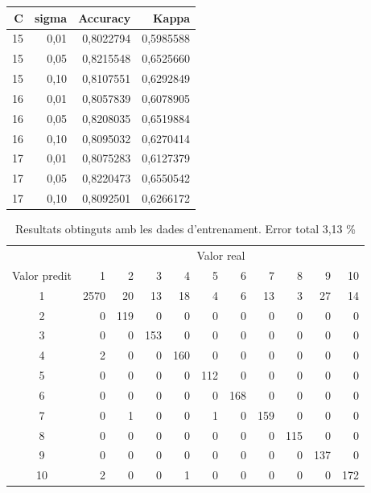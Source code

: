 \documentclass[a4paper]{article}
\begin{document}
\begin{table}[H]
	\centering
	\def\arraystretch{1.2}
	\begin{tabular}{|rrrr|}
		\hline
		C & sigma & Accuracy & Kappa \\
		\hline
		15 & 0,01 & 0,8022794 & 0,5985588 \\
		15 & 0,05 & 0,8215548 & 0,6525660 \\
		15 & 0,10 & 0,8107551 & 0,6292849 \\
		16 & 0,01 & 0,8057839 & 0,6078905 \\
		16 & 0,05 & 0,8208035 & 0,6519884 \\
		16 & 0,10 & 0,8095032 & 0,6270414 \\
		17 & 0,01 & 0,8075283 & 0,6127379 \\
		\rowcolor{Orange!40}
		17 & 0,05 & 0,8220473 & 0,6550542 \\
		17 & 0,10 & 0,8092501 & 0,6266172 \\
		\hline
	\end{tabular}
\end{table}

\begin{table}[H]
	\centering
	\def\arraystretch{1.2}
	\begin{tabular}{|c|rrrrrrrrrr|}
		\hline
		& \multicolumn{10}{c|}{Valor real} \\
		Valor predit & 1 & 2 & 3 & 4 & 5 & 6 & 7 & 8 & 9 & 10 \\
		\hline
		1 & 2570 & 20 & 13 & 18 & 4 & 6 & 13 & 3 & 27 & 14 \\
		2 & 0 & 119 & 0 & 0 & 0 & 0 & 0 & 0 & 0 & 0 \\
		3 & 0 & 0 & 153 & 0 & 0 & 0 & 0 & 0 & 0 & 0 \\
		4 & 2 & 0 & 0 & 160 & 0 & 0 & 0 & 0 & 0 & 0 \\
		5 & 0 & 0 & 0 & 0 & 112 & 0 & 0 & 0 & 0 & 0 \\
		6 & 0 & 0 & 0 & 0 & 0 & 168 & 0 & 0 & 0 & 0 \\
		7 & 0 & 1 & 0 & 0 & 1 & 0 & 159 & 0 & 0 & 0 \\
		8 & 0 & 0 & 0 & 0 & 0 & 0 & 0 & 115 & 0 & 0 \\
		9 & 0 & 0 & 0 & 0 & 0 & 0 & 0 & 0 & 137 & 0 \\
		10 & 2 & 0 & 0 & 1 & 0 & 0 & 0 & 0 & 0 & 172 \\
		\hline
	\end{tabular}
	\caption{Resultats obtinguts amb les dades d'entrenament. Error total 3,13 \%}
	\label{tab:svm_radial_k1}
\end{table}
\end{document}
